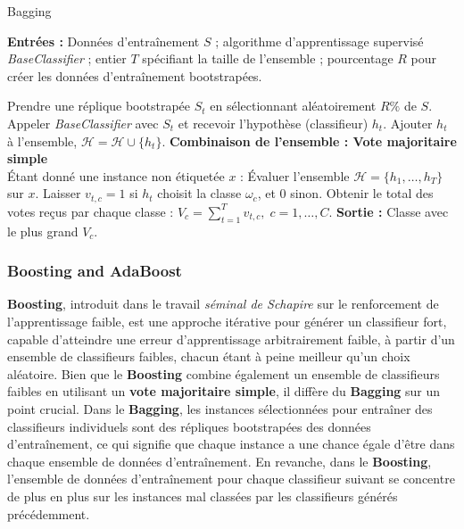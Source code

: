 \begin{algorithm}
	\caption{Bagging}
	\textbf{Entrées :} Données d'entraînement $S$ ; algorithme d'apprentissage supervisé \textit{BaseClassifier} ; entier $T$ spécifiant la taille de l'ensemble ; pourcentage $R$ pour créer les données d'entraînement bootstrapées.
	\begin{algorithmic}
		\State Prendre une réplique bootstrapée $S_t$ en sélectionnant aléatoirement $R\%$ de $S$.
		\State Appeler \textit{BaseClassifier} avec $S_t$ et recevoir l'hypothèse (classifieur) $h_t$.
		\State Ajouter $h_t$ à l'ensemble, $\mathcal{H} = \mathcal{H} \cup \{h_t\}$.
		\EndFor
		\textbf{Combinaison de l'ensemble : Vote majoritaire simple}\\
		\State Étant donné une instance non étiquetée $x$ :
		\State Évaluer l'ensemble $\mathcal{H} = \{h_1, \dots, h_T\}$ sur $x$.
		\State Laisser $v_{t,c} = 1$ si $h_t$ choisit la classe $\omega_c$, et 0 sinon.
		\EndFor
		\State Obtenir le total des votes reçus par chaque classe : $V_c = \sum_{t=1}^{T} v_{t,c}, \; c = 1, \dots, C$.
		\State \textbf{Sortie :} Classe avec le plus grand $V_c$.
	\end{algorithmic}
\end{algorithm}


\subsubsection{Boosting and AdaBoost}
\textbf{Boosting}, introduit dans le travail \textit{séminal de Schapire} sur le renforcement de l'apprentissage faible, est une approche itérative pour générer un classifieur fort, capable d'atteindre une erreur d'apprentissage arbitrairement faible, à partir d'un ensemble de classifieurs faibles, chacun étant à peine meilleur qu'un choix aléatoire. Bien que le \textbf{Boosting} combine également un ensemble de classifieurs faibles en utilisant un \textbf{vote majoritaire simple}, il diffère du \textbf{Bagging} sur un point crucial. Dans le \textbf{Bagging}, les instances sélectionnées pour entraîner des classifieurs individuels sont des répliques bootstrapées des données d'entraînement, ce qui signifie que chaque instance a une chance égale d'être dans chaque ensemble de données d'entraînement. En revanche, dans le \textbf{Boosting}, l'ensemble de données d'entraînement pour chaque classifieur suivant se concentre de plus en plus sur les instances mal classées par les classifieurs générés précédemment.

